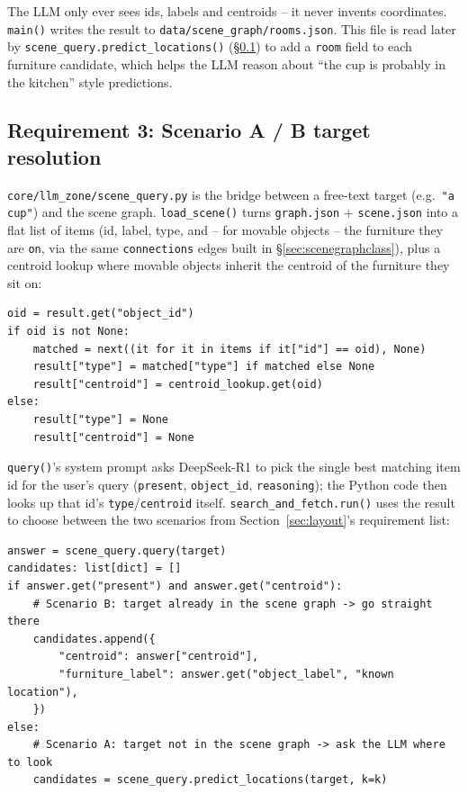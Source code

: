 \documentclass[11pt]{article}
\begin{document}
The LLM only ever sees ids, labels and centroids -- it never invents
coordinates. \texttt{main()} writes the result to
\texttt{data/scene\_graph/rooms.json}. This file is read later by
\texttt{scene\_query.predict\_locations()} (\S\ref{sec:scenario}) to add a
\texttt{room} field to each furniture candidate, which helps the LLM reason
about ``the cup is probably in the kitchen'' style predictions.

\subsection{Requirement 3: Scenario A / B target resolution}
\label{sec:scenario}

\texttt{core/llm\_zone/scene\_query.py} is the bridge between a free-text
target (e.g.\ \texttt{"a cup"}) and the scene graph. \texttt{load\_scene()}
turns \texttt{graph.json} + \texttt{scene.json} into a flat list of items
(id, label, type, and -- for movable objects -- the furniture they are
\texttt{on}, via the same \texttt{connections} edges built in
\S\ref{sec:scenegraphclass}), plus a centroid lookup where movable objects
inherit the centroid of the furniture they sit on:

\begin{lstlisting}[caption={\texttt{scene\_query.py}: \texttt{query()} attaches type and centroid from the local lookup, never from the LLM (lines 131--138)}]
oid = result.get("object_id")
if oid is not None:
    matched = next((it for it in items if it["id"] == oid), None)
    result["type"] = matched["type"] if matched else None
    result["centroid"] = centroid_lookup.get(oid)
else:
    result["type"] = None
    result["centroid"] = None
\end{lstlisting}

\texttt{query()}'s system prompt asks DeepSeek-R1 to pick the single best
matching item id for the user's query (\texttt{present}, \texttt{object\_id},
\texttt{reasoning}); the Python code then looks up that id's
\texttt{type}/\texttt{centroid} itself. \texttt{search\_and\_fetch.run()}
uses the result to choose between the two scenarios from
Section~\ref{sec:layout}'s requirement list:

\begin{lstlisting}[caption={\texttt{search\_and\_fetch.py}: \texttt{run()} scenario selection (lines 96--108)}]
answer = scene_query.query(target)
candidates: list[dict] = []
if answer.get("present") and answer.get("centroid"):
    # Scenario B: target already in the scene graph -> go straight there
    candidates.append({
        "centroid": answer["centroid"],
        "furniture_label": answer.get("object_label", "known location"),
    })
else:
    # Scenario A: target not in the scene graph -> ask the LLM where to look
    candidates = scene_query.predict_locations(target, k=k)
\end{lstlisting}
\end{document}
